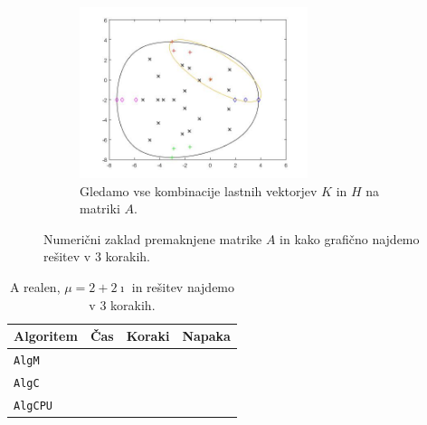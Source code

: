 \documentclass[12pt,a4paper]{amsart}
\theoremstyle{definition}
\theoremstyle{plain}
\begin{document}
\begin{figure}[H]
\begin{subfigure}[t]{0.45\textwidth}
\label{fig:p53}
\end{subfigure}%
\hfill
\begin{subfigure}[t]{0.45\textwidth}
\includegraphics[width=0.9\linewidth,height=5cm]{RC3e3.jpg}
\caption{Gledamo vse kombinacije lastnih vektorjev $K$ in $H$ na matriki $A$\footnotemark[\value{footnote}].}
\label{fig:p53}
\end{subfigure}
\caption{Numerični zaklad premaknjene matrike $A$ in kako grafično najdemo rešitev v 3 korakih.}
\end{figure}

\begin{table}[H]
\begin{tabular}{|l|l|c|r|}
\hline
Algoritem & Čas & Koraki & Napaka\\
\hline
\hline
\verb+AlgM+ & & & \\
\hline
\verb+AlgC+ & & & \\
\hline
\verb+AlgCPU+ & & & \\
\hline
\end{tabular}
\caption{A realen, $\mu = 2 + 2\imath$ in rešitev najdemo v 3 korakih.}
\label{t5}
\end{table}
\end{document}
